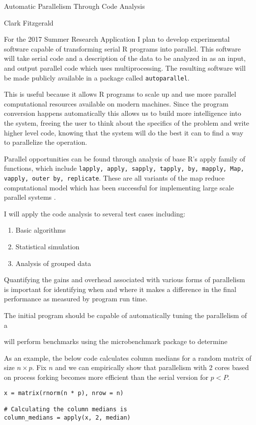 \documentclass[12pt]{article}
\begin{document}
\begin{center}
    \large Automatic Parallelism Through Code Analysis 

    \normalsize Clark Fitzgerald
\end{center}

\vspace{3\baselineskip}

For the 2017 Summer Research Application I plan to develop experimental software capable
of transforming serial R programs into parallel. This software will take
serial code and a description of the data to be analyzed in as an input,
and output parallel code which uses multiprocessing. The resulting software
will be made publicly available in a package called \texttt{autoparallel}.

This is useful because it allows R programs to scale up and use more
parallel computational resources available on modern machines. Since the
program conversion happens automatically this allows us to build more
intelligence into the system, freeing the user to think about the specifics
of the problem and write higher level code, knowing that the system will do
the best it can to find a way to parallelize the operation.

Parallel opportunities can be found through analysis of base R's apply family of functions,
which include \texttt{lapply, apply, sapply, tapply, by, mapply, Map, vapply, outer
by, replicate}. These are all variants of the map reduce computational model which
has been successful for implementing large scale parallel systems
\cite{dean2008mapreduce}.

I will apply the code analysis to several test cases including:
\begin{enumerate}
    \item Basic algorithms
    \item Statistical simulation
    \item Analysis of grouped data
\end{enumerate}

Quantifying the gains and overhead associated with various forms of
parallelism is important for identifying when and where it makes a
difference in the final performance as measured by program run time.

The initial program should be capable of automatically tuning the
parallelism of a 

will perform benchmarks using the microbenchmark
package to determine 


As an example, the below code calculates column medians for a random matrix
of size $n \times p$. Fix $n$ and we can empirically show that
parallelism with 2 cores based on process forking becomes more efficient
than the serial version for $p < P$.
\begin{verbatim}
x = matrix(rnorm(n * p), nrow = n)

# Calculating the column medians is 
column_medians = apply(x, 2, median)
\end{verbatim}


 
\end{document}
